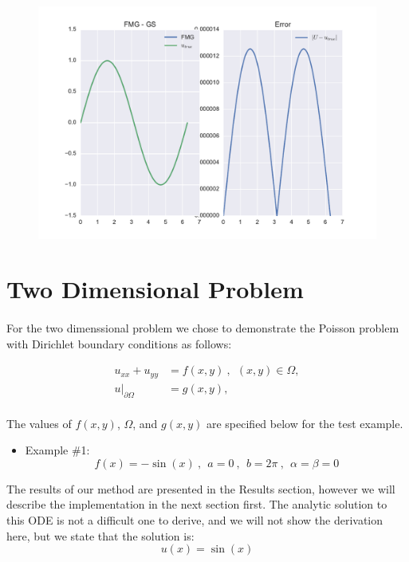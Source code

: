 \documentclass[pdftex,12pt,a4paper]{article}
\begin{document}
\begin{figure}[h]
            \includegraphics[scale=.4]{../plots/fmg_sol_1d.pdf}
        \end{figure}


\section{Two Dimensional Problem}
    \paragraph*{} For the two dimenssional problem we chose to demonstrate the Poisson problem with Dirichlet boundary conditions as follows:
    
    \begin{equation}
    \begin{aligned}
        u_{xx} + u_{yy} &= f(x, y) ~ , ~~ (x, y) \in \Omega, \\
        u|_{\partial \Omega} &= g(x, y), \\
    \end{aligned}
    \end{equation}
    
    The values of $f(x, y)$, $\Omega$, and $g(x, y)$ are specified below for the test example. \\
    \begin{itemize}
        \item Example \#1: 
            \begin{equation*}
                f(x) = -\sin(x) ~ , ~~ a = 0 ~ , ~~ b = 2 \pi ~ , ~~ \alpha = \beta = 0
            \end{equation*}

    \end{itemize}
    The results of our method are presented in the Results section, however we will describe the implementation in the next section first. The analytic solution to this ODE is not a difficult one to derive, and we will not show the derivation here, but we state that the solution is: $$ u(x) = \sin(x) $$
\end{document}
